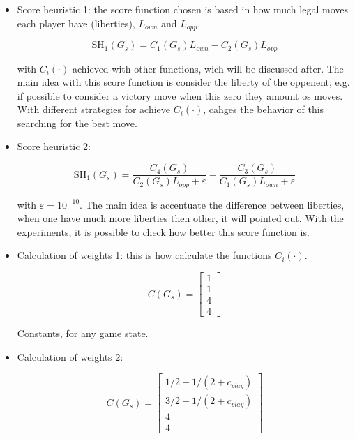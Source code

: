 \documentclass[a4paper]{article}
\begin{document}
\begin{itemize}
    \item Score heuristic 1: the score function chosen is based in how much legal moves each player have (liberties), $L_{own}$ and $L_{opp}$. 
    
    \begin{equation}
        \text{SH}_1(G_s) = C_1(G_s)  L_{own} - C_2(G_s) L_{opp}  \label{SH1}
    \end{equation}
    
    \noindent with $C_i(\cdot)$ achieved with other functions, wich will be discussed after. The main idea with this score function is consider the liberty of the oppenent, e.g. if possible to consider a victory move when this zero they amount os moves. With different strategies for achieve $C_i(\cdot)$, cahges the behavior of this searching for the best move.
    
    \item Score heuristic 2: 
    
    \begin{equation}
        \text{SH}_1(G_s) =  \frac{C_4(G_s)}{C_2(G_s) L_{opp} + \varepsilon} - \frac{C_3(G_s)}{C_1(G_s) L_{own} + \varepsilon}  \label{SH2}
    \end{equation}
    
    \noindent with $\varepsilon = 10^{-10}$. The main idea is accentuate the difference between liberties, when one have much more liberties then other, it will pointed out. With the experiments, it is possible to check how better this score function is.
    
    \item Calculation of weights 1: this is how calculate the functions $C_i(\cdot)$.
    
    \begin{equation}
        C(G_s) =  \begin{bmatrix} 1 \\ 1 \\ 4 \\ 4 \end{bmatrix}  \label{C1}
    \end{equation}
    
    \noindent Constants, for any game state.
    
    \item Calculation of weights 2:
    
    \begin{equation}
        C(G_s) =  \begin{bmatrix} 
        1/2+1/({2+c_{play}}) \\
        3/2-1/({2+c_{play}}) \\ 
                                  4 \\ 4 \end{bmatrix}  \label{C2}
    \end{equation}
    

\end{itemize}
\end{document}
